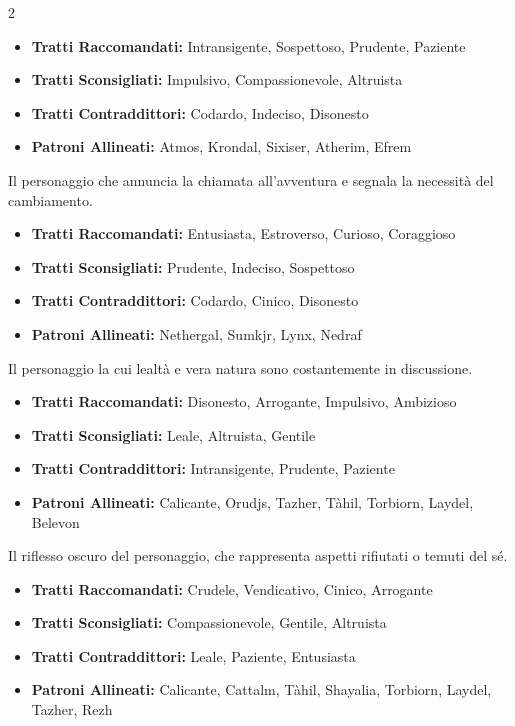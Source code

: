 \begin{multicols}{2}
\noindent\begin{itemize}[leftmargin=*] \setlength{\itemsep}{0pt}
\item \textbf{Tratti Raccomandati:} Intransigente, Sospettoso, Prudente, Paziente
\item \textbf{Tratti Sconsigliati:} Impulsivo, Compassionevole, Altruista
\item \textbf{Tratti Contraddittori:} Codardo, Indeciso, Disonesto
\item \textbf{Patroni Allineati:} Atmos, Krondal, Sixiser, Atherim, Efrem
\end{itemize}

Il personaggio che annuncia la chiamata all'avventura e segnala la necessità del cambiamento.

\noindent\begin{itemize}[leftmargin=*] \setlength{\itemsep}{0pt}
\item \textbf{Tratti Raccomandati:} Entusiasta, Estroverso, Curioso, Coraggioso
\item \textbf{Tratti Sconsigliati:} Prudente, Indeciso, Sospettoso
\item \textbf{Tratti Contraddittori:} Codardo, Cinico, Disonesto
\item \textbf{Patroni Allineati:} Nethergal, Sumkjr, Lynx, Nedraf
\end{itemize}

Il personaggio la cui lealtà e vera natura sono costantemente in discussione.

\noindent\begin{itemize}[leftmargin=*] \setlength{\itemsep}{0pt}
\item \textbf{Tratti Raccomandati:} Disonesto, Arrogante, Impulsivo, Ambizioso
\item \textbf{Tratti Sconsigliati:} Leale, Altruista, Gentile
\item \textbf{Tratti Contraddittori:} Intransigente, Prudente, Paziente
\item \textbf{Patroni Allineati:} Calicante, Orudjs, Tazher, Tàhil, Torbiorn, Laydel, Belevon
\end{itemize}

Il riflesso oscuro del personaggio, che rappresenta aspetti rifiutati o temuti del sé.

\noindent\begin{itemize}[leftmargin=*] \setlength{\itemsep}{0pt}
\item \textbf{Tratti Raccomandati:} Crudele, Vendicativo, Cinico, Arrogante
\item \textbf{Tratti Sconsigliati:} Compassionevole, Gentile, Altruista
\item \textbf{Tratti Contraddittori:} Leale, Paziente, Entusiasta
\item \textbf{Patroni Allineati:} Calicante, Cattalm, Tàhil, Shayalia, Torbiorn, Laydel, Tazher, Rezh
\end{itemize}


\end{multicols}
